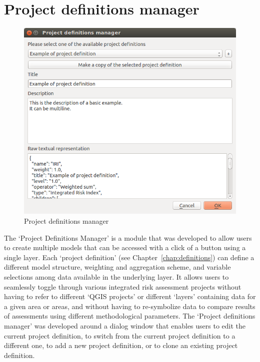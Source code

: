 \chapter{Project definitions manager}
\label{chap:project_definitions_manager}

\begin{figure}
    \centering
    \includegraphics[width=\textwidth]{../images/image13}
    \caption{Project definitions manager}
    \label{fig:project_definitions_manager}
\end{figure}

The `Project Definitions Manager' is a module that was developed to allow users
to create multiple models that can be accessed with a click of a button using a
single layer. Each `project definition' (see Chapter~\ref{chap:definitions}) can
define a different model structure, weighting and aggregation scheme, and
variable selections among data available in the underlying layer. It allows
users to seamlessly toggle through various integrated risk assessment projects
without having to refer to different `QGIS projects' or different `layers'
containing data for a given area or areas, and without having to re-symbolize
data to compare results of assessments using different methodological
parameters. The `Project definitions manager' was developed around a dialog
window that enables users to edit the current project definition, to switch
from the current project definition to a different one, to add a new project
definition, or to clone an existing project definition.

